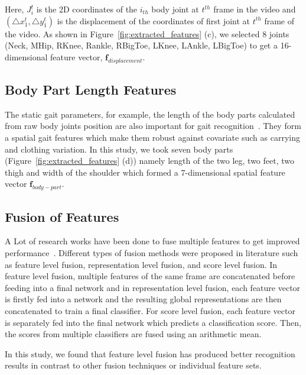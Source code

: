 Here, $J_i^{t}$ is the 2D coordinates of the $i_{th}$ body joint at $t^{th}$ frame in the video and $(\triangle x_1^t , \triangle y_1^t )$ is the displacement of the coordinates of first joint at $t^{th}$ frame of the video. As shown in Figure~\ref{fig:extracted_features} (c), we selected 8 joints (Neck, MHip, RKnee, Rankle, RBigToe, LKnee, LAnkle, LBigToe) to get a 16-dimensional feature vector, $\textbf{f}_{displacement}$.


\subsection{Body Part Length Features}
The static gait parameters, for example, the length of the body parts calculated from raw body joints position are also important for gait recognition~\cite{Wang_04, Araujo_13}. They form a spatial gait features which make them robust against covariate such as carrying and clothing variation. In this study, we took seven body parts (Figure~\ref{fig:extracted_features} (d)) namely length of the two leg, two feet, two thigh and width of the shoulder which formed a 7-dimensional spatial feature vector $\textbf{f}_{body-part}$. 


\subsection{Fusion of Features}
A Lot of research works have been done to fuse multiple features to get improved performance~\cite{Liao_19, Wang_04}.  Different types of fusion methods were proposed in literature such as feature level fusion, representation level fusion, and score level fusion. In feature level fusion, multiple features of the same frame are concatenated before feeding into a final network and in representation level fusion, each feature vector is firstly fed into a network and the resulting global representations are then concatenated to train a final classifier. For score level fusion, each feature vector is separately fed into the final network which predicts a classification score. Then, the scores from multiple classifiers are fused using an arithmetic mean.

In this study, we found that feature level fusion has produced better recognition results in contrast to other fusion techniques or individual feature sets. 


